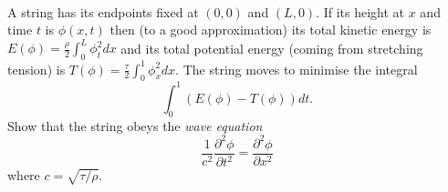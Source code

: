 \documentclass[12pt]{article}
\begin{document}
\iffalse
\begin{answer}
\begin{enumerate}[(a)]
\item The Euler-Lagrange equation
\[\pd{}{x}\pd{L}{\phi_x}+\pd{}{y}\pd{L}{\phi_y}=\pd{L}{\phi}\]
becomes
\[\pd{}{x}\pd{\phi}{x}+\pd{}{y}\pd{\phi}{y}=K\phi\]
that is the Helmholtz equation $\Delta\phi=K\phi$.\mks{3}
\item The Euler-Lagrange equation
\[\pd{}{x}\pd{L}{\phi_x}+\pd{}{y}\pd{L}{\phi_y}=\pd{L}{\phi}\]
becomes
\[\pd{}{x}\left(2\phi^2\pd{\phi}{x}\right)+\pd{}{y}\left(2\pd{\phi}{y}\right)=2\phi\left(\pd{\phi}{x}\right)^2\]
or
\[4\phi\left(\pd{\phi}{x}\right)^2+2\phi^2\ppd{\phi}{x}+2\ppd{\phi}{y}=2\phi\left(\pd{\phi}{x}\right)^2.\]
Simplifying gives\mks{3}
\[0=\phi^2\ppd{\phi}{x}+\ppd{\phi}{y}+\phi\left(\pd{\phi}{x}\right)^2.\]
\item The Euler-Lagrange equation
\[\pd{}{x}\pd{L}{\phi_x}+\pd{}{y}\pd{L}{\phi_y}=\pd{L}{\phi}\]
becomes
\[\pd{}{x}\pd{\phi}{y}+\pd{}{y}\pd{\phi}{x}=0\]
or
\[\ppdd{\phi}{x}{y}=0.\]
The general solution is $F(x)+G(y)$ for arbitrary functions $F$ and $G$.\mks{4}
\item Modify the functional to
\[\frac{1}{2}\left(\left(\pd{\phi}{x}\right)^2+\left(\pd{\phi}{y}\right)^2\right)-\lambda(\phi^2-K)\]
the Euler-Lagrange equation
\[\pd{}{x}\pd{L}{\phi_x}+\pd{}{y}\pd{L}{\phi_y}=\pd{L}{\phi}\]
becomes
\[\pd{}{x}\pd{\phi}{x}+\pd{}{y}\pd{\phi}{y}=-2\lambda\phi\]
or $\Delta\phi=-2\lambda\phi$ (again this is Helmholtz's equation).
\item The Euler-Lagrange equation
\[\pd{}{x}\pd{L}{\phi_x}+\pd{}{y}\pd{L}{\phi_y}=\pd{L}{\phi}\]
becomes
\[\pd{}{x}\left(-\frac{1}{\phi_x^2}\right)+\pd{}{y}\left(-\frac{1}{\phi_y^2}\right)=0\]
or
\[\frac{2\phi_{xx}}{\phi_x^3}+\frac{2\phi_{yy}}{\phi_y^3}=0.\]
Equivalently
\[\phi_y^3\phi_{xx}+\phi_x^3\phi_{yy}=0.\]
\end{enumerate}
\end{answer}
\fi

\bigskip

\begin{question}\ \\
A string has its endpoints fixed at $(0,0)$ and $(L,0)$. If its height at $x$ and time $t$ is $\phi(x,t)$ then (to a good approximation) its total kinetic energy is $E(\phi)=\frac{\rho}{2}\int_0^L\phi_t^2dx$ and its total potential energy (coming from stretching tension) is $T(\phi)=\frac{\tau}{2}\int_0^1\phi_x^2dx$. The string moves to minimise the integral
\[\int_0^1(E(\phi)-T(\phi))dt.\]
Show that the string obeys the {\em wave equation}
\[\frac{1}{c^2}\frac{\partial^2\phi}{\partial t^2}=\frac{\partial^2\phi}{\partial x^2}\]
where $c=\sqrt{\tau/\rho}$.
\end{question}
\end{document}
